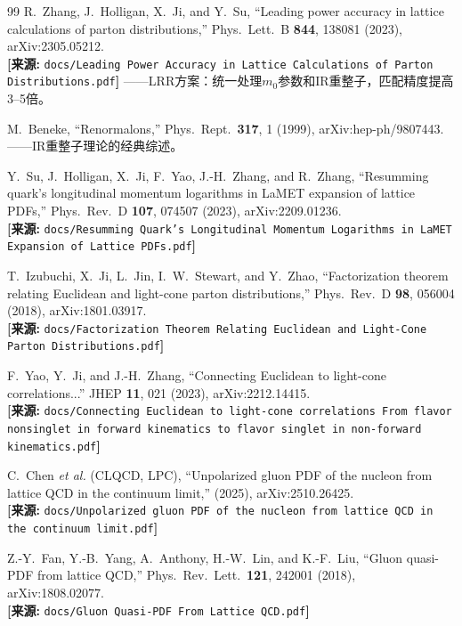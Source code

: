\documentclass[12pt,a4paper]{ctexart}
\theoremstyle{definition}
\begin{document}
\begin{thebibliography}{99}
R.~Zhang, J.~Holligan, X.~Ji, and Y.~Su,
``Leading power accuracy in lattice calculations of parton distributions,''
Phys.\ Lett.\ B \textbf{844}, 138081 (2023), arXiv:2305.05212.
\\\textbf{[来源:} \texttt{docs/Leading Power Accuracy in Lattice Calculations of Parton Distributions.pdf}\textbf{]}
——LRR方案：统一处理$m_0$参数和IR重整子，匹配精度提高3--5倍。

M.~Beneke,
``Renormalons,''
Phys.\ Rept.\ \textbf{317}, 1 (1999), arXiv:hep-ph/9807443.
——IR重整子理论的经典综述。

Y.~Su, J.~Holligan, X.~Ji, F.~Yao, J.-H.~Zhang, and R.~Zhang,
``Resumming quark's longitudinal momentum logarithms in LaMET expansion of lattice PDFs,''
Phys.\ Rev.\ D \textbf{107}, 074507 (2023), arXiv:2209.01236.
\\\textbf{[来源:} \texttt{docs/Resumming Quark's Longitudinal Momentum Logarithms in LaMET Expansion of Lattice PDFs.pdf}\textbf{]}

T.~Izubuchi, X.~Ji, L.~Jin, I.~W.~Stewart, and Y.~Zhao,
``Factorization theorem relating Euclidean and light-cone parton distributions,''
Phys.\ Rev.\ D \textbf{98}, 056004 (2018), arXiv:1801.03917.
\\\textbf{[来源:} \texttt{docs/Factorization Theorem Relating Euclidean and Light-Cone Parton Distributions.pdf}\textbf{]}

F.~Yao, Y.~Ji, and J.-H.~Zhang,
``Connecting Euclidean to light-cone correlations...''
JHEP \textbf{11}, 021 (2023), arXiv:2212.14415.
\\\textbf{[来源:} \texttt{docs/Connecting Euclidean to light-cone correlations From flavor nonsinglet in forward kinematics to flavor singlet in non-forward kinematics.pdf}\textbf{]}

C.~Chen \textit{et al.} (CLQCD, LPC),
``Unpolarized gluon PDF of the nucleon from lattice QCD in the continuum limit,''
(2025), arXiv:2510.26425.
\\\textbf{[来源:} \texttt{docs/Unpolarized gluon PDF of the nucleon from lattice QCD in the continuum limit.pdf}\textbf{]}

Z.-Y.~Fan, Y.-B.~Yang, A.~Anthony, H.-W.~Lin, and K.-F.~Liu,
``Gluon quasi-PDF from lattice QCD,''
Phys.\ Rev.\ Lett.\ \textbf{121}, 242001 (2018), arXiv:1808.02077.
\\\textbf{[来源:} \texttt{docs/Gluon Quasi-PDF From Lattice QCD.pdf}\textbf{]}


\end{thebibliography}
\end{document}
